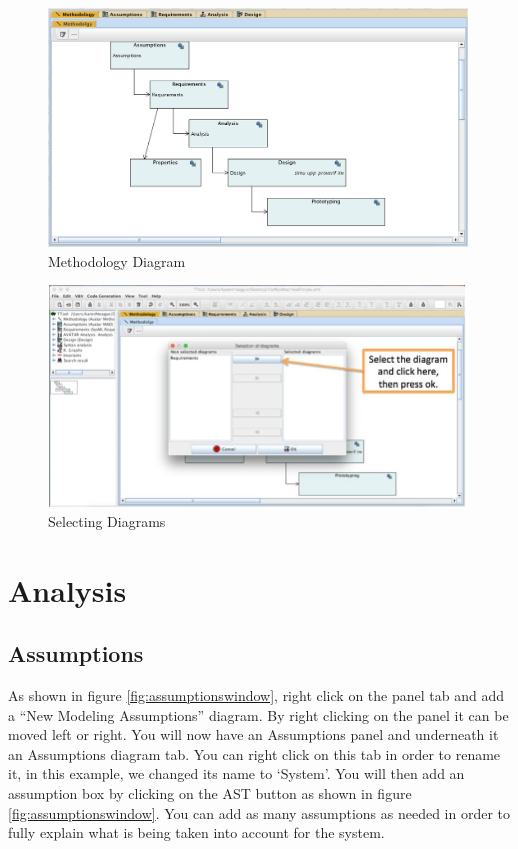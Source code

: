 \documentclass[12pt]{article}
\begin{document}
\begin{figure}[htbp]
\centering
\includegraphics[width=0.99\textwidth]{fig/methoddiagram.png}
\caption{Methodology Diagram} \label{fig:methoddiagram}
\end{figure}


\begin{figure}[htbp]
\centering
\includegraphics[width=0.99\textwidth]{fig/selectdiagram.jpg}
\caption{Selecting Diagrams} \label{fig:selectdiagram}
\end{figure}


\section{Analysis}
\subsection{Assumptions}

As shown in figure  \ref{fig:assumptionswindow}, right click on the panel tab and add a “New Modeling Assumptions” diagram. By right clicking on the panel it can be moved left or right. You will now have an Assumptions panel and underneath it an Assumptions diagram tab. You can right click on this tab in order to rename it, in this example, we changed its name to ‘System’. You will then add an assumption box by clicking on the AST button as shown in figure \ref{fig:assumptionswindow}. You can add as many assumptions as needed in order to fully explain what is being taken into account for the system. 
\end{document}
